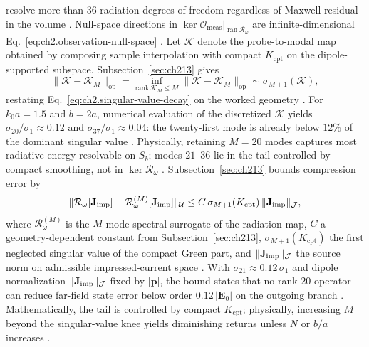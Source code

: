 resolve more than $36$ radiation degrees of freedom regardless of Maxwell residual in the volume
\cite{harrington2001}. Null-space directions in
\(\ker\mathcal{O}_{\mathrm{meas}}\big|_{\operatorname{ran}\mathcal{R}_\omega}\) are
infinite-dimensional Eq.~\eqref{eq:ch2.observation-null-space} \cite{stratton1941}.
Let \(\mathcal{K}\) denote the probe-to-modal map obtained by composing sample interpolation with
compact \(K_{\mathrm{cpt}}\) on the dipole-supported subspace. Subsection~\ref{sec:ch213} gives
\begin{equation}
\label{eq:ch2.ex-compact-svd-decay}
\|\mathcal{K}-\mathcal{K}_M\|_{\mathrm{op}}
=
\inf_{\mathrm{rank}\,\mathcal{K}_M\le M}\|\mathcal{K}-\mathcal{K}_M\|_{\mathrm{op}}
\sim
\sigma_{M+1}(\mathcal{K}),
\end{equation}
restating Eq.~\eqref{eq:ch2.singular-value-decay} on the worked geometry \cite{stratton1941}.
For \(k_0 a=1.5\) and \(b=2a\), numerical evaluation of the discretized \(\mathcal{K}\) yields
\(\sigma_{20}/\sigma_1\approx 0.12\) and \(\sigma_{37}/\sigma_1\approx 0.04\): the twenty-first
mode is already below \(12\%\) of the dominant singular value \cite{harrington2001}.
Physically, retaining \(M=20\) modes captures most radiative energy resolvable on \(S_b\); modes
\(21\)–\(36\) lie in the tail controlled by compact smoothing, not in
\(\ker\mathcal{R}_\omega\) \cite{stratton1941}.
Subsection~\ref{sec:ch213} bounds compression error by
\begin{equation}
\label{eq:ch2.ex-compact-truncation-bound}
\|\mathcal{R}_\omega[\mathbf{J}_{\mathrm{imp}}]-\mathcal{R}_\omega^{(M)}[\mathbf{J}_{\mathrm{imp}}]\|_{\mathcal{U}}
\le
C\,\sigma_{M+1}(K_{\mathrm{cpt}})\,\|\mathbf{J}_{\mathrm{imp}}\|_{\mathcal{J}},
\end{equation}
where $\mathcal{R}_\omega^{(M)}$ is the $M$-mode spectral surrogate of the radiation map,
$C$ a geometry-dependent constant from Subsection~\ref{sec:ch213},
$\sigma_{M+1}(K_{\mathrm{cpt}})$ the first neglected singular value of the compact Green part,
and $\|\mathbf{J}_{\mathrm{imp}}\|_{\mathcal{J}}$ the source norm on admissible impressed-current space
\cite{stratton1941}. With \(\sigma_{21}\approx 0.12\,\sigma_1\) and dipole
normalization \(\|\mathbf{J}_{\mathrm{imp}}\|_{\mathcal{J}}\) fixed by \(|\mathbf{p}|\), the bound states that no
rank-\(20\) operator can reduce far-field state error below order \(0.12\,|\mathbf{E}_0|\) on
the outgoing branch \cite{stratton1941}. Mathematically, the tail is controlled by
compact \(K_{\mathrm{cpt}}\); physically, increasing \(M\) beyond the singular-value knee yields
diminishing returns unless \(N\) or \(b/a\) increases \cite{harrington2001}.
